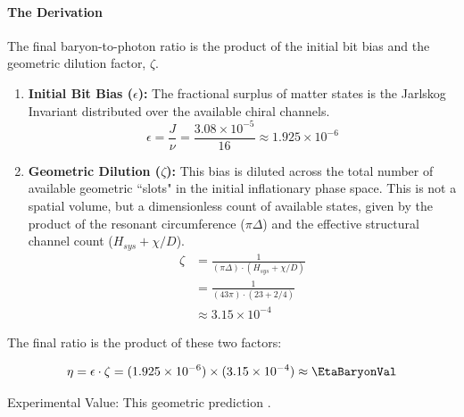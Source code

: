 \paragraph{The Derivation}
The final baryon-to-photon ratio is the product of the initial bit bias and the geometric dilution factor, $\zeta$.
\begin{enumerate}
    \item \textbf{Initial Bit Bias ($\epsilon$):} The fractional surplus of matter states is the Jarlskog Invariant distributed over the available chiral channels.
    \begin{equation}
        \epsilon = \frac{J}{\nu} = \frac{3.08 \times 10^{-5}}{16} \approx 1.925 \times 10^{-6}
    \end{equation}

    \item \textbf{Geometric Dilution ($\zeta$):} This bias is diluted across the total number of available geometric ``slots" in the initial inflationary phase space. This is not a spatial volume, but a dimensionless count of available states, given by the product of the resonant circumference ($\pi\Delta$) and the effective structural channel count ($H_{sys} + \chi/D$).
    \begin{equation}
    \begin{split}
        \zeta & = \frac{1}{(\pi \Delta) \cdot (H_{sys} + \chi/D)} \\
        & = \frac{1}{(43\pi) \cdot (23 + 2/4)} \\
        & \approx 3.15 \times 10^{-4}
    \end{split}
    \end{equation}
\end{enumerate}
The final ratio is the product of these two factors:

\begin{equation}
\eta = \epsilon \cdot \zeta = (1.925 \times 10^{-6}) \times (3.15 \times 10^{-4}) \approx \mathbf{\EtaBaryonVal}
\end{equation}

Experimental Value: \EtaBaryonExperimentalValue
This geometric prediction \EtaBaryonAccText.



